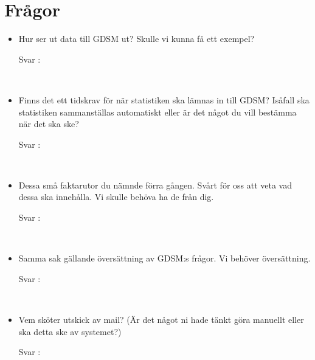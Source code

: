 \documentclass{article}
\date {#1}
\title {
    \documentTitle {Helsingborg Event and Convention Bureau}
    
    \documentDate {}
}
\begin{document}
\maketitle
\thispagestyle{empty}

\newpage




\newpage

\section{Frågor}

 
\begin{itemize}
    \item Hur ser ut data till GDSM ut? Skulle vi kunna få ett exempel?
        \begin{description}
            \item[Svar :]
        \end{description}
    \\
     \item Finns det ett tidskrav för när statistiken ska lämnas in till GDSM? Isåfall ska statistiken sammanställas automatiskt eller är det något du vill bestämma när det ska ske?
        \begin{description}
            \item[Svar :]
        \end{description}
    \\
    \item Dessa små faktarutor du nämnde förra gången. Svårt för oss att veta vad dessa ska innehålla. Vi skulle behöva ha de från dig.
        \begin{description}
            \item[Svar :]
        \end{description}  
    \\
     \item Samma sak gällande översättning av GDSM:s frågor. Vi behöver översättning. 
        \begin{description}
            \item[Svar :]
        \end{description}
    \\
    \item Vem sköter utskick av mail? (Är det något ni hade tänkt göra manuellt eller ska detta ske av systemet?)
        \begin{description}
            \item[Svar :]
        \end{description}
    \\
\end{itemize}
\end{document}
